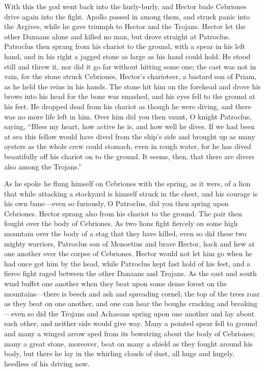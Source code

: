 With this the god went back into the hurly-burly, and Hector bade
Cebriones drive again into the fight. Apollo passed in among them, and
struck panic into the Argives, while he gave triumph to Hector and the
Trojans. Hector let the other Danaans alone and killed no man, but drove
straight at Patroclus. Patroclus then sprang from his chariot to the
ground, with a spear in his left hand, and in his right a jagged stone as
large as his hand could hold. He stood still and threw it, nor did it go
far without hitting some one; the cast was not in vain, for the stone
struck Cebriones, Hector’s charioteer, a bastard son of Priam, as he held
the reins in his hands. The stone hit him on the forehead and drove his
brows into his head for the bone was smashed, and his eyes fell to the
ground at his feet. He dropped dead from his chariot as though he were
diving, and there was no more life left in him. Over him did you then
vaunt, O knight Patroclus, saying, “Bless my heart, how active he is, and
how well he dives. If we had been at sea this fellow would have dived from
the ship’s side and brought up as many oysters as the whole crew could
stomach, even in rough water, for he has dived beautifully off his chariot
on to the ground. It seems, then, that there are divers also among the
Trojans.”

As he spoke he flung himself on Cebriones with the spring, as it were, of
a lion that while attacking a stockyard is himself struck in the chest,
and his courage is his own bane—even so furiously, O Patroclus, did
you then spring upon Cebriones. Hector sprang also from his chariot to the
ground. The pair then fought over the body of Cebriones. As two lions
fight fiercely on some high mountain over the body of a stag that they
have killed, even so did these two mighty warriors, Patroclus son of
Menoetius and brave Hector, hack and hew at one another over the corpse of
Cebriones. Hector would not let him go when he had once got him by the
head, while Patroclus kept fast hold of his feet, and a fierce fight raged
between the other Danaans and Trojans. As the east and south wind buffet
one another when they beat upon some dense forest on the mountains—there
is beech and ash and spreading cornel; the top of the trees roar as they
beat on one another, and one can hear the boughs cracking and breaking—even
so did the Trojans and Achaeans spring upon one another and lay about each
other, and neither side would give way. Many a pointed spear fell to
ground and many a winged arrow sped from its bowstring about the body of
Cebriones; many a great stone, moreover, beat on many a shield as they
fought around his body, but there he lay in the whirling clouds of dust,
all huge and hugely, heedless of his driving now.

